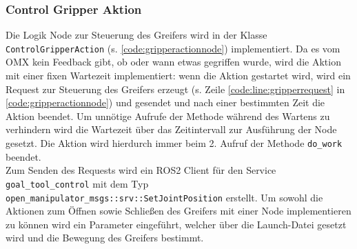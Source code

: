 \subsubsection{Control Gripper Aktion}
Die Logik Node zur Steuerung des Greifers wird in der Klasse \verb|ControlGripperAction| (s. \ref{code:gripperactionnode}) implementiert. Da es vom OMX kein Feedback gibt, ob oder wann etwas gegriffen wurde, wird die Aktion mit einer fixen Wartezeit implementiert: wenn die Aktion gestartet wird, wird ein Request zur Steuerung des Greifers erzeugt (s. Zeile \ref{code:line:gripperrequest} in \ref{code:gripperactionnode}) und gesendet und nach einer bestimmten Zeit die Aktion beendet. Um unnötige Aufrufe der Methode während des Wartens zu verhindern wird die Wartezeit über das Zeitintervall zur Ausführung der Node gesetzt. Die Aktion wird hierdurch immer beim 2. Aufruf der Methode \verb|do_work| beendet.\\
Zum Senden des Requests wird ein \ac{ROS2} Client für den Service \verb|goal_tool_control| mit dem Typ \verb|open_manipulator_msgs::srv::SetJointPosition| erstellt. 
Um sowohl die Aktionen zum Öffnen sowie Schließen des Greifers mit einer Node implementieren zu können wird ein Parameter eingeführt, welcher über die Launch-Datei gesetzt wird und die Bewegung des Greifers bestimmt.
